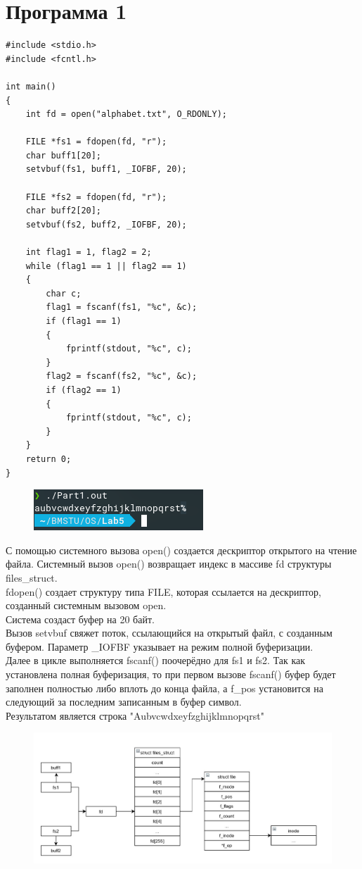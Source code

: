 \documentclass[14pt, a4paper]{extarticle}
\begin{document}
\section*{Программа 1}
\begin{lstlisting}
#include <stdio.h>
#include <fcntl.h>

int main()
{
	int fd = open("alphabet.txt", O_RDONLY);
	
	FILE *fs1 = fdopen(fd, "r");
	char buff1[20];
	setvbuf(fs1, buff1, _IOFBF, 20);
	
	FILE *fs2 = fdopen(fd, "r");
	char buff2[20];
	setvbuf(fs2, buff2, _IOFBF, 20);
	
	int flag1 = 1, flag2 = 2;
	while (flag1 == 1 || flag2 == 1)
	{
		char c;
		flag1 = fscanf(fs1, "%c", &c);
		if (flag1 == 1)
		{
			fprintf(stdout, "%c", c);
		}
		flag2 = fscanf(fs2, "%c", &c);
		if (flag2 == 1)
		{
			fprintf(stdout, "%c", c);
		}
	}
	return 0;
}
\end{lstlisting}
\begin{figure}[h!]
	\includegraphics[scale=1]{source/Part1.png}
\end{figure}
С помощью системного вызова open() создается дескриптор открытого на чтение файла. Системный вызов open() возвращает индекс в массиве fd структуры files\_struct.\\
fdopen() создает структуру типа FILE, которая ссылается на дескриптор, созданный системным вызовом open.\\
Система создаст буфер на 20 байт. \\
Вызов setvbuf свяжет поток, ссылающийся на открытый файл, с созданным буфером. Параметр \_IOFBF указывает на режим полной буферизации.\\
Далее в цикле выполняется fscanf() поочерёдно для fs1 и fs2. Так как установлена полная буферизация, то при первом вызове fscanf() буфер будет заполнен полностью либо вплоть до конца файла, а f\_pos установится на следующий за последним записанным в буфер символ.\\
Результатом является строка "Aubvcwdxeyfzghijklmnopqrst"\\

\begin{figure}[h!]
\includegraphics[scale=0.6]{source/diag1.jpg}
\end{figure}
\clearpage
\end{document}
